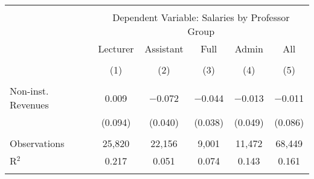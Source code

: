
\begin{tabular}{@{\extracolsep{5pt}}lccccc} 
\\[-1.8ex]\hline 
\hline \\[-1.8ex] 
 & \multicolumn{5}{c}{Dependent Variable: Salaries by Professor Group} \\ 
\cline{2-6} 
 & Lecturer & Assistant & Full & Admin & All \\ 
\\[-1.8ex] & (1) & (2) & (3) & (4) & (5)\\ 
\hline \\[-1.8ex] 
 Non-inst. Revenues & 0.009 & $-$0.072 & $-$0.044 & $-$0.013 & $-$0.011 \\ 
  & (0.094) & (0.040) & (0.038) & (0.049) & (0.086) \\ 
 \hline \\[-1.8ex] 
Observations & 25,820 & 22,156 & 9,001 & 11,472 & 68,449 \\ 
R$^{2}$ & 0.217 & 0.051 & 0.074 & 0.143 & 0.161 \\ 
\hline 
\hline \\[-1.8ex] 
\end{tabular} 
